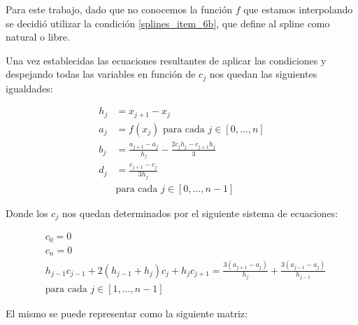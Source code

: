 Para este trabajo, dado que no conocemos la función $f$ que estamos
interpolando se decidió utilizar la condición \ref{splines_item_6b}, que define
al spline como natural o libre.

Una vez establecidas las ecuaciones resultantes de aplicar las condiciones y
despejando todas las variables en función de $c_j$ nos quedan las siguientes
igualdades:

\begin{align*}
	h_j &= x_{j+1} - x_j \\
	a_j &= f(x_j) \text{ para cada } j \in [0, \dots, n] \\
	b_j &= \frac{a_{j+1}-a_j}{h_j} - \frac{2c_jh_j - c_{j+1}h_j}{3} \\
	d_j &= \frac{c_{j+1} - c_j}{3h_j} \\
		&\text{para cada } j \in [0, \dots, n - 1]
\end{align*}

Donde los $c_j$ nos quedan determinados por el siguiente sistema de ecuaciones:

\begin{align*}
	&c_0 = 0 \\
	&c_n = 0 \\
	&h_{j-1}c_{j-1} + 2(h_{j-1} + h_j)c_j + h_jc_{j+1} = \frac{3(a_{j+1} - a_j)}{h_j} + \frac{3(a_{j-1} - a_j)}{h_{j-1}} \\
		&\text{para cada } j \in [1, \dots, n - 1]
\end{align*}

El mismo se puede representar como la siguiente matriz:

\setlength{\arraycolsep}{2pt}

